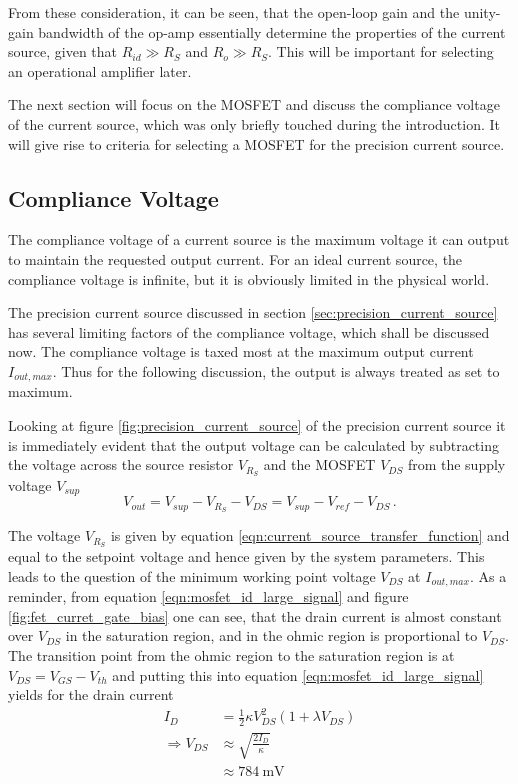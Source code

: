From these consideration, it can be seen, that the open-loop gain and the unity-gain bandwidth of the op-amp essentially determine the properties of the current source, given that $R_{id} \gg R_S$ and $R_o \gg R_S$. This will be important for selecting an operational amplifier later.

The next section will focus on the MOSFET and discuss the compliance voltage of the current source, which was only briefly touched during the introduction. It will give rise to criteria for selecting a MOSFET for the precision current source.

\subsection{Compliance Voltage}%
\label{sec:compliance_voltage}
The compliance voltage of a current source is the maximum voltage it can output to maintain the requested output current. For an ideal current source, the compliance voltage is infinite, but it is obviously limited in the physical world.

The precision current source discussed in section \ref{sec:precision_current_source} has several limiting factors of the compliance voltage, which shall be discussed now. The compliance voltage is taxed most at the maximum output current $I_{out,max}$. Thus for the following discussion, the output is always treated as set to maximum.

Looking at figure \ref{fig:precision_current_source} of the precision current source it is immediately evident that the output voltage can be calculated by subtracting the voltage across the source resistor $V_{R_S}$ and the MOSFET $V_{DS}$ from the supply voltage $V_{sup}$
\begin{equation*}
    V_{out} = V_{sup} - V_{R_S} - V_{DS} = V_{sup} - V_{ref} - V_{DS}\,.
\end{equation*}

The voltage $V_{R_S}$ is given by equation \ref{eqn:current_source_transfer_function} and equal to the setpoint voltage and hence given by the system parameters. This leads to the question of the minimum working point voltage $V_{DS}$ at $I_{out,max}$. As a reminder, from equation \ref{eqn:mosfet_id_large_signal} and figure \ref{fig:fet_curret_gate_bias} one can see, that the drain current is almost constant over $V_{DS}$ in the saturation region, and in the ohmic region is proportional to $V_{DS}$. The transition point from the ohmic region to the saturation region is at $V_{DS} = V_{GS} - V_{th}$ and putting this into equation \ref{eqn:mosfet_id_large_signal} yields for the drain current
\begin{align}
    I_D &= \frac{1}{2} \kappa V_{DS}^2 \left(1+ \lambda V_{DS}\right) \nonumber\\
    \Rightarrow V_{DS} &\approx \sqrt{\frac{2 I_D}{\kappa}}\\
    &\approx \qty{784}{\mV}
\end{align}

